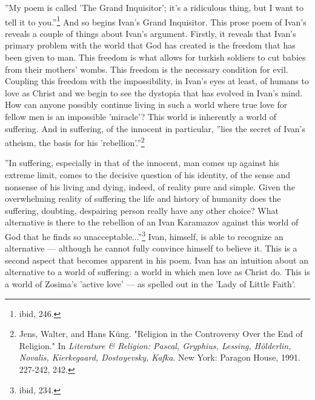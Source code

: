 ''My poem is called 'The Grand Inquisitor'; it's a ridiculous thing, but I want to tell it to you.''\footnote{ibid, 246.} And so begins Ivan's Grand Inquisitor. This prose poem of Ivan's reveals a couple of things about Ivan's argument. Firstly, it reveals that Ivan's primary problem with the world that God has created is the freedom that has been given to man. This freedom is what allows for turkish soldiers to cut babies from their mothers' wombs. This freedom is the necessary condition for evil. Coupling this freedom with the impossibility, in Ivan's eyes at least, of humans to love as Christ and we begin to see the dystopia that has evolved in Ivan's mind. How can anyone possibly continue living in such a world where true love for fellow men is an impossible 'miracle'? This world is inherently a world of suffering. And in suffering, of the innocent in particular, ''lies the secret of Ivan's atheism, the basis for his 'rebellion'.''\footnote{Jens, Walter, and Hans Küng. "Religion in the Controversy Over the End of Religion." In \emph{Literature & Religion: Pascal, Gryphius, Lessing, Hölderlin, Novalis, Kierkegaard, Dostoyevsky, Kafka}. New York: Paragon House, 1991. 227-242, 242.}

''In suffering, especially in that of the innocent, man comes up against his extreme limit, comes to the decisive question of his identity, of the sense and nonsense of his living and dying, indeed, of reality pure and simple. Given the overwhelming reality of suffering the life and history of humanity does the suffering, doubting, despairing person really have any other choice? What alternative is there to the rebellion of an Ivan Karamazov against this world of God that he finds so unacceptable...''\footnote{ibid, 234.} Ivan, himself, is able to recognize an alternative --- although he cannot fully convince himself to believe it. This is a second aspect that becomes apparent in his poem. Ivan has an intuition about an alternative to a world of suffering: a world in which men love as Christ do. This is a world of Zosima's 'active love' --- as spelled out in the 'Lady of Little Faith'.

